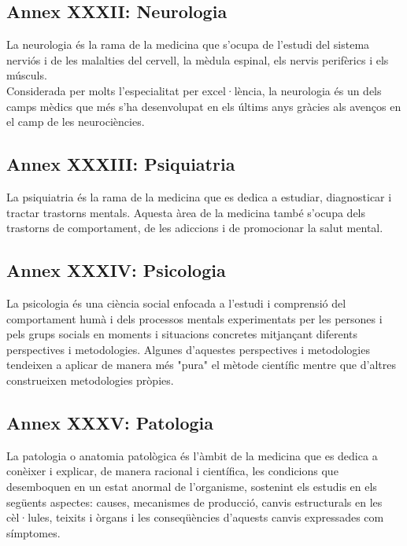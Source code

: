 \documentclass[a4paper,12pt]{article}
\begin{document}
\subsection*{Annex XXXII: Neurologia}
La neurologia és la rama de la medicina que s'ocupa de l'estudi del sistema nerviós i de les malalties del cervell, la mèdula espinal, els nervis perifèrics i els músculs.\\
Considerada per molts l'especialitat per excel·lència, la neurologia és un dels camps mèdics que més s'ha desenvolupat en els últims anys gràcies als avenços en el camp de les neurociències.
\subsection*{Annex XXXIII: Psiquiatria}
La psiquiatria és la rama de la medicina que es dedica a estudiar, diagnosticar i tractar trastorns mentals. Aquesta àrea de la medicina també s'ocupa dels trastorns de comportament, de les adiccions i de promocionar la salut mental.
\subsection*{Annex XXXIV: Psicologia}
La psicologia és una ciència social enfocada a l'estudi i comprensió del comportament humà i dels processos mentals experimentats per les persones i pels grups socials en moments i situacions concretes mitjançant diferents perspectives i metodologies. Algunes d'aquestes perspectives i metodologies tendeixen a aplicar de manera més "pura" el mètode científic mentre que d'altres construeixen metodologies pròpies.
\subsection*{Annex XXXV: Patologia}
La patologia o anatomia patològica és l'àmbit de la medicina que es dedica a conèixer i explicar, de manera racional i científica, les condicions que desemboquen en un estat anormal de l'organisme, sostenint els estudis en els següents aspectes: causes, mecanismes de producció, canvis estructurals en les cèl·lules, teixits i òrgans i les conseqüències d'aquests canvis expressades com símptomes.
\end{document}

